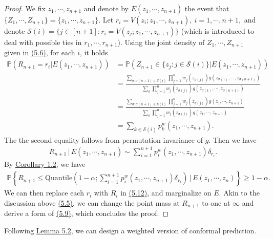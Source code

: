 \documentclass{article}
\numberwithin{equation}{section}
\begin{document}
\begin{proof}
We fix $z_1,\cdots,z_{n+1}$ and denote by $E(z_1,\cdots,z_{n+1})$ the event that $\{Z_1,\cdots,Z_{n+1}\} = \{z_1,\cdots,z_{n+1}\}$. Let $r_i=V(z_i;z_1,\cdots,z_{n+1}),\ i=1,\cdots,n+1,$ and denote $\mathcal{S}(i)=\{j\in[n+1]:r_i=V(z_j;z_1,\cdots,z_{n+1})\}$ (which is introduced to deal with possible ties in $r_1,\cdots,r_{n+1}$). Using the joint density of $Z_1,\cdots,Z_{n+1}$ given in \hyperref[5.6]{(5.6)}, for each $i$, it holds
\begin{align*}
	\mathbb{P}(R_{n+1}=r_i|E(z_1,\cdots,z_{n+1})) &= \mathbb{P}(Z_{n+1}\in\{z_j:j\in\mathcal{S}(i)\}|E(z_1,\cdots,z_{n+1}))\\
	&= \frac{\sum_{\sigma:\sigma(n+1)\in\mathcal{S}(i)}\prod_{j=1}^n w_j(z_{\sigma(j)})g(z_{\sigma(1)}, \cdots, z_{\sigma(n+1)})}{\sum_{\sigma} \prod_{j=1}^n w_j(z_{\sigma(j)})g(z_{\sigma(1)}, \cdots, z_{\sigma(n+1)})}\\
	&= \frac{\sum_{\sigma:\sigma(n+1)\in\mathcal{S}(i)}\prod_{j=1}^n w_j(z_{\sigma(j)})g(z_{1}, \cdots, z_{n+1})}{\sum_{\sigma} \prod_{j=1}^n w_j(z_{\sigma(j)})g(z_{1}, \cdots, z_{n+1})}\\
	&= \sum_{k\in\mathcal{S}(i)} p_k^w(z_1,\cdots,z_{n+1}).\tag{5.10}
\end{align*}
The the second equality follows from permutation invariance of $g$. Then we have
\begin{align*}
	R_{n+1}\,|\,E(z_1,\cdots,z_{n+1})\sim\sum_{i=1}^{n+1}p_i^w(z_1,\cdots,z_{n+1})\delta_{r_i}.\tag{5.11}
\end{align*}
By \hyperref[Corollary 1.2]{Corollary 1.2}, we have
\begin{align*}
\mathbb{P}\left\{R_{n+1}\leq\mathrm{Quantile}\left(1-\alpha;\sum_{i=1}^{n+1}p_i^w(z_1,\cdots,z_{n+1})\delta_{r_i}\right)\,\bigg|\,E(z_1,\cdots,z_n)\right\} \geq 1-\alpha.\tag{5.12}\label{5.12}
\end{align*}
We can then replace each $r_i$ with $R_i$ in \hyperref[5.12]{(5.12)}, and marginalize on $E$. Akin to the discussion above \hyperref[5.5]{(5.5)}, we can change the point mass at $R_{n+1}$ to one at $\infty$ and derive a form of \hyperref[5.9]{(5.9)}, which concludes the proof.
\end{proof}

Following \hyperref[Lemma 5.2]{Lemma 5.2}, we can design a weighted version of conformal prediction.
\end{document}
